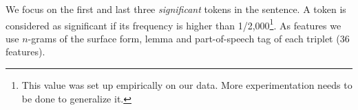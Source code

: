 We focus on the first and last three \textit{significant} tokens in the sentence. %
A token is considered as significant if its frequency is higher than  1/2,000\footnote{This value was set up empirically on our data. More experimentation needs to be done to generalize it.}.
As features we use $n$-grams of the surface form, lemma and part-of-speech tag of each triplet (36 features).
%
%


